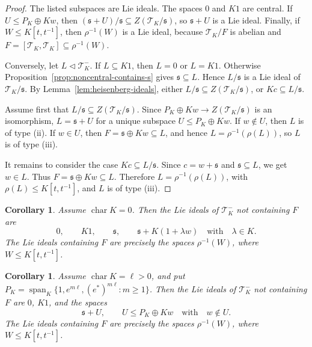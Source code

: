 \documentclass[11pt]{article}
\numberwithin{equation}{section}
\theoremstyle{plain}
\newtheorem{corollary}[theorem]{Corollary}
\theoremstyle{definition}
\numberwithin{equation}{section}
\newcommand{\T}{\mathscr T_K}
\newcommand{\Span}{\operatorname{span}_K}
\newcommand{\ch}{\operatorname{char}}
\begin{document}
\begin{proof}
The listed subspaces are Lie ideals. The spaces $0$ and $K1$ are central. If $U\leq P_K\oplus Kw$, then $(\mathfrak s+U)/\mathfrak s\subseteq Z(\T/\mathfrak s)$, so $\mathfrak s+U$ is a Lie ideal. Finally, if $W\leq K[t,t^{-1}]$, then $\rho^{-1}(W)$ is a Lie ideal, because $\T/F$ is abelian and $F=[\T,\T]\subseteq\rho^{-1}(W)$.

Conversely, let $L\triangleleft\T^-$. If $L\subseteq K1$, then $L=0$ or $L=K1$. Otherwise Proposition~\ref{prop:noncentral-contains-s} gives $\mathfrak s\subseteq L$. Hence $L/\mathfrak s$ is a Lie ideal of $\T/\mathfrak s$. By Lemma~\ref{lem:heisenberg-ideals}, either $L/\mathfrak s\subseteq Z(\T/\mathfrak s)$, or $Kc\subseteq L/\mathfrak s$.

Assume first that $L/\mathfrak s\subseteq Z(\T/\mathfrak s)$. Since $P_K\oplus Kw\to Z(\T/\mathfrak s)$ is an isomorphism, $L=\mathfrak s+U$ for a unique subspace $U\leq P_K\oplus Kw$. If $w\notin U$, then $L$ is of type {\rm(ii)}. If $w\in U$, then $F=\mathfrak s\oplus Kw\subseteq L$, and hence $L=\rho^{-1}(\rho(L))$, so $L$ is of type {\rm(iii)}.

It remains to consider the case $Kc\subseteq L/\mathfrak s$. Since $c=w+\mathfrak s$ and $\mathfrak s\subseteq L$, we get $w\in L$. Thus $F=\mathfrak s\oplus Kw\subseteq L$. Therefore $L=\rho^{-1}(\rho(L))$, with $\rho(L)\leq K[t,t^{-1}]$, and $L$ is of type {\rm(iii)}.
\end{proof}

\begin{corollary}\label{cor:char0}
Assume $\ch K=0$. Then the Lie ideals of $\T^-$ not containing $F$ are
$$
0,\qquad K1,\qquad \mathfrak s,\qquad \mathfrak s+K(1+\lambda w)\quad\text{with}\quad\lambda\in K.
$$
The Lie ideals containing $F$ are precisely the spaces $\rho^{-1}(W)$, where $W\leq K[t,t^{-1}]$.
\end{corollary}

\begin{corollary}\label{cor:charpos}
Assume $\ch K=\ell>0$, and put $P_K=\Span\{1,e^{m\ell},(e^*)^{m\ell}:m\geq1\}$. Then the Lie ideals of $\T^-$ not containing $F$ are $0$, $K1$, and the spaces
$$
\mathfrak s+U,\qquad U\leq P_K\oplus Kw\quad\text{with}\quad w\notin U.
$$
The Lie ideals containing $F$ are precisely the spaces $\rho^{-1}(W)$, where $W\leq K[t,t^{-1}]$.
\end{corollary}
\end{document}
